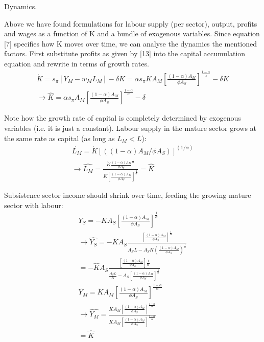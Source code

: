 \documentclass[a4paper]{article}
\begin{document}
Dynamics.

Above we have found formulations for labour supply (per sector), output, profits and wages as a function of K and a bundle of exogenous variables. Since equation [7] specifies how K moves over time, we can analyse the dynamics the mentioned factors. First substitute profits as given by [13] into the capital accumulation equation and rewrite in terms of growth rates.
\begin{align}
\dot{K}= s_\pi [Y_M-w_M L_M ]-\delta K= \alpha s_\pi K A_M [\frac{(1-\alpha)A_M}{\phi A_S}]^{\frac{1-\alpha}{\alpha}}-\delta K \nonumber \\
\rightarrow	\hat{K}=\alpha s_\pi A_M [\frac{(1-\alpha)A_M}{\phi A_S}]^{\frac{1-\alpha}{\alpha}}-\delta
\end{align}

Note how the growth rate of capital is completely determined by exogenous variables (i.e. it is just a constant). Labour supply in the mature sector grows at the same rate as capital (as long as  $L_M<L$):
\begin{align}
\dot{L_M}=\dot{K}[((1-\alpha)A_M/\phi A_S)]^(1/\alpha) \nonumber \\
\rightarrow \hat{L_M}=\frac{\dot{K}\frac{(1-\alpha)A_M}{\phi A_S}^{\frac{1}{\alpha}}}{K[\frac{(1-\alpha)A_M}{\phi A_S}]^{\frac{1}{\alpha}}}=\hat{K}
\end{align}

Subsistence sector income should shrink over time, feeding the growing mature sector with labour:
\begin{align}
\dot{Y_S}=-\dot{K}A_S [\frac{(1-\alpha)A_M}{\phi A_S}]^{\frac{1}{\alpha}} \nonumber \\
\rightarrow \hat{Y_S}=-\dot{K}A_S \frac{[\frac{(1-\alpha)A_M}{\phi A_S}]^{\frac{1}{\alpha}}}{A_S L-A_S K(\frac{(1-\alpha)A_M}{\phi A_S})^{\frac{1}{\alpha}}} \nonumber \\
=-\hat{K}A_S \frac{[\frac{(1-\alpha)A_M}{\phi A_S}]{\frac{1}{\alpha}}}{\frac{A_S L}{K}-A_S [\frac{(1-\alpha)A_M}{\phi A_S}]^{\frac{1}{\alpha}}} \\
\dot{Y_M}=\dot{K}A_M [\frac{(1-\alpha)A_M}{\phi A_S}]^{\frac{1-\alpha}{\alpha}} \nonumber \\
\rightarrow	\hat{Y_M}=\frac{\dot{K}A_M [\frac{(1-\alpha)A_M}{\phi A_S}]^{\frac{1-\alpha}{\alpha}}}{KA_M [\frac{(1-\alpha)A_M}{\phi A_S}]^{\frac{1-\alpha}{\alpha}}} \nonumber \\
=\hat{K}
\end{align}
\end{document}
